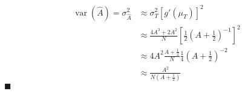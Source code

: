 \documentclass{exam}
\theoremstyle{mytheoremstyle}
\theoremstyle{mytheoremstyle}
\theoremstyle{myproblemstyle}
\begin{document}
\begin{questions}
    \begin{solution}
        \begin{align*}
            \operatorname{var}\left(\hat{A}\right)=\sigma^{2}_{\hat{A}} & \approx\sigma^{2}_{T}\left[g'\left(\mu_{T}\right)\right]^{2}                              \\
                                                                        & \approx\frac{4A^{3}+2A^{2}}{N}\left[\frac{1}{2}\left(A+\frac{1}{2}\right)^{-1}\right]^{2} \\
                                                                        & \approx4A^{2}\frac{A+\frac{1}{2}}{N}\frac{1}{4}\left(A+\frac{1}{2}\right)^{-2}            \\
                                                                        & \approx\frac{A^2}{N\left(A+\frac{1}{2}\right)}
        \end{align*}
        \center \(\blacksquare\)
    \end{solution}
\end{questions}
\end{document}
